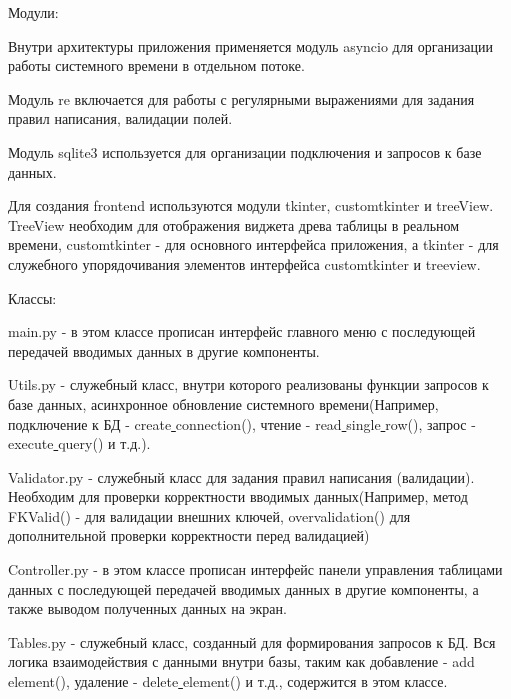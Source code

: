 Модули:

Внутри архитектуры приложения применяется модуль asyncio для организации работы системного времени в отдельном потоке.

Модуль re включается для работы с регулярными выражениями для задания правил написания, валидации полей.

Модуль sqlite3 используется для организации подключения и запросов к базе данных.

Для создания frontend используются модули tkinter, customtkinter и treeView. TreeView необходим для отображения виджета древа таблицы в реальном времени,  customtkinter - для основного интерфейса приложения, а tkinter - для служебного упорядочивания элементов интерфейса customtkinter и treeview.

Классы:

main.py - в этом классе прописан интерфейс главного меню с последующей передачей вводимых данных в другие компоненты.

Utils.py - служебный класс, внутри которого реализованы функции запросов к базе данных, асинхронное обновление системного времени(Например, подключение к БД - create\underline{ }connection(), чтение - read\underline{ }single\underline{ }row(), запрос - execute\underline{ }query() и т.д.).

Validator.py - служебный класс для задания правил написания (валидации). Необходим для проверки корректности вводимых данных(Например, метод FKValid() - для валидации внешних ключей, overvalidation() для дополнительной проверки корректности перед валидацией)

Controller.py - в этом классе прописан интерфейс панели управления таблицами данных с последующей передачей вводимых данных в другие компоненты, а также выводом полученных данных на экран.

Tables.py - служебный класс, созданный для формирования запросов к БД. Вся логика взаимодействия с данными внутри базы, таким как добавление - add\underline{ }element(), удаление - delete\underline{ }element() и т.д., содержится в этом классе.